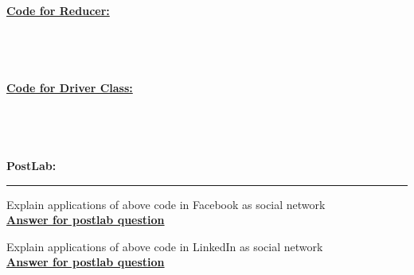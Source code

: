 \documentclass[11pt,article]{memoir}
\begin{document}
\begin{flushleft}
\begin{lstlisting}[language=java]
	
\end{lstlisting}

\textbf{\underline{Code for Reducer:}}
\begin{lstlisting}[language=java]





\end{lstlisting}

\textbf{\underline{Code for Driver Class:}}
\begin{lstlisting}[language=java]





\end{lstlisting}



\newpage
\textbf{PostLab:}\hrule
Explain applications of above code in Facebook as social network\\
\textbf{\underline{Answer for postlab question}}                        
                          
\newpage
Explain applications of above code in LinkedIn as social network\\
\textbf{\underline{Answer for postlab question}}    
\end{flushleft}
\end{document}
